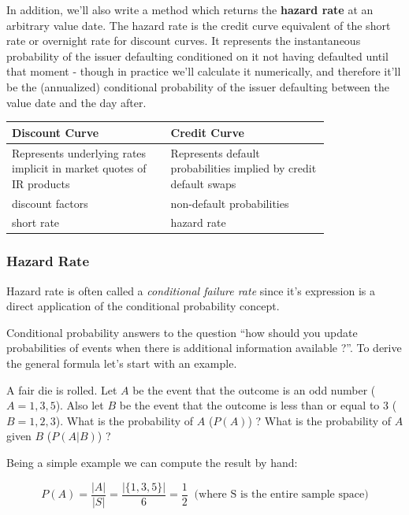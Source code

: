 \documentclass[11pt]{article}
\begin{document}
In addition, we'll also write a method which returns the \textbf{hazard
rate} at an arbitrary value date. The hazard rate is the credit curve
equivalent of the short rate or overnight rate for discount curves. It
represents the instantaneous probability of the issuer defaulting
conditioned on it not having defaulted until that moment - though in
practice we'll calculate it numerically, and therefore it'll be the
(annualized) conditional probability of the issuer defaulting between
the value date and the day after.

\begin{center}
  \begin{tabular}{|| m{0.4\linewidth} | m{0.4\linewidth} ||}
    \hline
    Discount Curve & Credit Curve \\
    \hline \hline
    Represents underlying rates implicit in market quotes of IR products &
    Represents default probabilities implied by credit default swaps \\
    \hline
    discount factors & non-default probabilities \\
    \hline
    short rate & hazard rate \\
    \hline    \hline
  \end{tabular}
\end{center}

\hypertarget{hazard-rate}{%
\subsubsection{Hazard Rate}\label{hazard-rate}}

Hazard rate is often called a \emph{conditional failure rate} since it's
expression is a direct application of the conditional probability
concept.

Conditional probability answers to the question ``how should you update
probabilities of events when there is additional information available
?''. To derive the general formula let's start with an example.

A fair die is rolled. Let \(A\) be the event that the outcome is an odd
number (\(A={1,3,5}\)). Also let \(B\) be the event that the outcome is
less than or equal to \(3\) (\(B={1,2,3}\)). What is the probability of
\(A\) (\(P(A)\)) ? What is the probability of \(A\) given \(B\)
(\(P(A|B)\)) ?

Being a simple example we can compute the result by hand:

\[P(A) = \frac{|A|}{|S|} = \frac{|\{1,3,5\}|}{6} = \frac{1}{2}\;\;\textrm{(where S is the entire sample space)}\]
\end{document}
